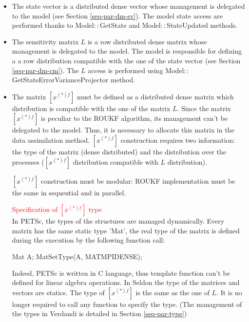 \documentclass{tufte-book}
\begin{document}
\begin{itemize}

\item The state vector is a distributed dense vector whose management is delegated to the model (see Section \ref{seq-par-dm-sv}). The model state access are performed thanks to Model$::$GetState and Model$::$StateUpdated methods.

\item The sensitivity matrix $L$ is a row distributed dense matrix whose management is delegated to the model. The model is responsible for defining a a row distribution compatible with the one of the state vector (see Section \ref{seq-par-dm-cm}). The $L$ access is performed using Model$::$GetStateErrorVarianceProjector method.

\item The matrix $ [x^{(*)f}]$ must be defined as a distributed dense matrix which distribution is compatible with the one of the matrix $L$. Since the matrix  $ [x^{(*)f}]$ is peculiar to the ROUKF algorithm, its management can't be delegated to the model. Thus, it is necessary to allocate this matrix in the data assimilation method. $ [x^{(*)f}]$ construction requires two information: the type of the matrix (dense distributed) and the distribution over the processes ($[x^{(*)f}]$ distribution compatible with $L$ distribution).


$ [x^{(*)f}]$ construction must be modular: ROUKF implementation must be the same in sequential and in parallel.


\par \textcolor{red}{Specification of $ [x^{(*)f}]$ type}\\

In PETSc, the types of the structures are managed dynamically. Every matrix has the same static type 'Mat', the real type of the matrix is defined during the execution by the following function call:

\begin{frame_cpp}
Mat A;
MatSetType(A, MATMPIDENSE);
\end{frame_cpp}


Indeed, PETSc is written in C language, thus template function can't be defined for linear algebra operations. In Seldon the type of the matrices and vectors are statics. The type of $[x^{(*)f}]$ is the same as the one of $L$. It is no longer required to call any function to specify the type. (The management of the types in Verdandi is detailed in Section \ref{seq-par-type})


\end{itemize}
\end{document}
